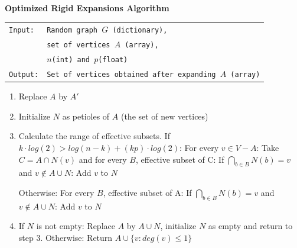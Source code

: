 \begin{cajita}
\textbf{Optimized Rigid Expansions Algorithm} \hfill \break

\begin{tabular}{ l l }
\texttt{Input:} &  \texttt{Random graph $G$ (dictionary),} \\
                &  \texttt{set of vertices $A$ (array),} \\
                &  \texttt{$n$(int) and $p$(float)} \\
\texttt{Output:} & \texttt{Set of vertices obtained after expanding $A$ (array)} \\
\end{tabular}
\begin{enumerate}
\item Replace $A$ by $A'$
\item Initialize $N$ as petioles of $A$ (the set of new vertices)
\item Calculate the range of effective subsets.\hfill \break
If $k\cdot log(2) > log(n-k) + (kp)\cdot log(2)$: \hfill \break
\hphantom{12} For every $v\in V-A$:\hfill \break
\hphantom{1234} Take $C = A\cap N(v)$ and for every $B$, effective subset of C:\hfill \break
\hphantom{123456} If $\bigcap\limits_{b\in B} N(b) = v$ and $v\not\in A\cup N$: \hfill \break
\hphantom{12341234} Add $v$ to $N$

Otherwise:\hfill \break
\hphantom{12} For every $B$, effective subset of A:\hfill \break
\hphantom{1234} If $\bigcap\limits_{b\in B} N(b) = v$ and $v\not\in A\cup N$: \hfill \break
\hphantom{123456} Add $v$ to $N$

\item If $N$ is not empty: \hfill \break
\hphantom{12} Replace $A$ by $A\cup N$, initialize $N$ as empty and return to step 3. \hfill \break
      Otherwise:\hfill \break
\hphantom{12} Return $A\cup\{v: deg(v)\leq 1 \}$
\end{enumerate}
\end{cajita}
